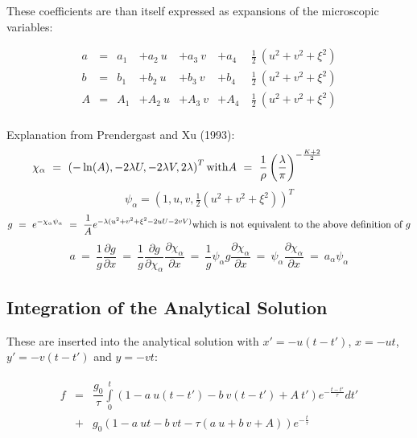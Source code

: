 \documentclass[
	pdftex,             %
	12pt,				%
	a4paper,		   	%
	english,				%
	oneside,			%
]{article}
\begin{document}
These coefficients are than itself expressed as expansions of the microscopic variables:

\begin{equation}
\begin{array}{lclllll}
a &=& a_1 &+ a_2~u &+ a_3~v &+ a_4~&\frac{1}{2}~(u^2 + v^2 + \xi^2) \\
b &=& b_1 &+ b_2~u &+ b_3~v &+ b_4~&\frac{1}{2}~(u^2 + v^2 + \xi^2) \\
A &=& A_1 &+ A_2~u &+ A_3~v &+ A_4~&\frac{1}{2}~(u^2 + v^2 + \xi^2) \\
\end{array}
\end{equation}

Explanation from Prendergast and Xu (1993):
\begin{equation}
\chi_\alpha ~=~ \left( -\ln(A), -2\lambda U, -2\lambda V, 2\lambda \right)^T
\hfill
\textnormal{with}
A ~=~ \dfrac{1}{\rho} \left( \frac{\lambda}{\pi} \right)^{-\frac{K+2}{2}}
\hspace{2cm}
\end{equation}
\begin{equation}
\psi_\alpha = \left( 1, u, v, \tfrac{1}{2} (u^2 + v^2 + \xi^2 ) \right)^T
\end{equation}
\begin{equation}
g ~=~ e^{-\chi_\alpha \psi_\alpha}
  ~=~ \dfrac{1}{A} e^{-\lambda ( u^2 + v^2 + \xi^2 - 2uU - 2vV) }
\hfill
\textnormal{which is not equivalent to the above definition of $g$}
\end{equation}
\begin{equation}
a ~=~ \dfrac{1}{g} \dfrac{\partial g}{\partial x}
  ~=~ \dfrac{1}{g} \dfrac{\partial g}{\partial \chi_\alpha}\dfrac{\partial \chi_\alpha}{\partial x}
  ~=~ \dfrac{1}{g} \psi_\alpha g \dfrac{\partial \chi_\alpha}{\partial x}
  ~=~ \psi_\alpha \dfrac{\partial \chi_\alpha}{\partial x}
  ~=~ a_\alpha \psi_\alpha
\end{equation}


\clearpage

\subsection*{Integration of the Analytical Solution}

These are inserted into the analytical solution with $x' = -u(t-t')$, $x = -ut$, $y' = -v(t-t')$ and $y = -vt$:

\begin{equation}
\begin{split}
\begin{array}{lcll}
f
&=&
\dfrac{g_0}{\tau} \int \limits_0^t
\left( 1 - a~u(t-t') - b~v(t-t') + A~t' \right) e^{-\tfrac{t-t'}{\tau}} dt'
\\
&+&
g_0 \left( 1 - a~ut - b~vt - \tau \left( a~u + b~v + A \right) \right) e^{-\tfrac{t}{\tau}}
\end{array}
\end{split}
\end{equation}
\end{document}
